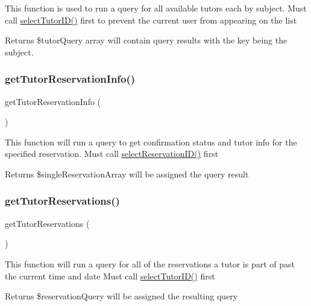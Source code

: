 This function is used to run a query for all available tutors each by subject. Must call \mbox{\hyperlink{_tutor___selection_8class_8php_abd658239b3f73bb1c30c51b4f4c4f2a2}{select\+Tutor\+I\+D()}} first to prevent the current user from appearing on the list \begin{DoxyReturn}{Returns}
\$tutor\+Query array will contain query results with the key being the subject. 
\end{DoxyReturn}
\mbox{\label{_tutor___selection_8class_8php_aa55c439250d7b602d25701d20080575c}} 
\subsubsection{\texorpdfstring{getTutorReservationInfo()}{getTutorReservationInfo()}}
{\footnotesize\ttfamily get\+Tutor\+Reservation\+Info (\begin{DoxyParamCaption}{ }\end{DoxyParamCaption})}

This function will run a query to get confirmation status and tutor info for the specified reservation. Must call \mbox{\hyperlink{_tutor___selection_8class_8php_a78fc1624ae4a44a300484ac00e0b9a96}{select\+Reservation\+I\+D()}} first \begin{DoxyReturn}{Returns}
\$single\+Reservation\+Array will be assigned the query result 
\end{DoxyReturn}
\mbox{\label{_tutor___selection_8class_8php_a8297068ed77f57ec6bd722bdffda73b4}} 
\subsubsection{\texorpdfstring{getTutorReservations()}{getTutorReservations()}}
{\footnotesize\ttfamily get\+Tutor\+Reservations (\begin{DoxyParamCaption}{ }\end{DoxyParamCaption})}

This function will run a query for all of the reservations a tutor is part of past the current time and date Must call \mbox{\hyperlink{_tutor___selection_8class_8php_abd658239b3f73bb1c30c51b4f4c4f2a2}{select\+Tutor\+I\+D()}} first \begin{DoxyReturn}{Returns}
\$reservation\+Query will be assigned the resulting query 
\end{DoxyReturn}
\mbox{\label{_tutor___selection_8class_8php_a917e4fb0b95699badf69324e683ef2f9}} 
